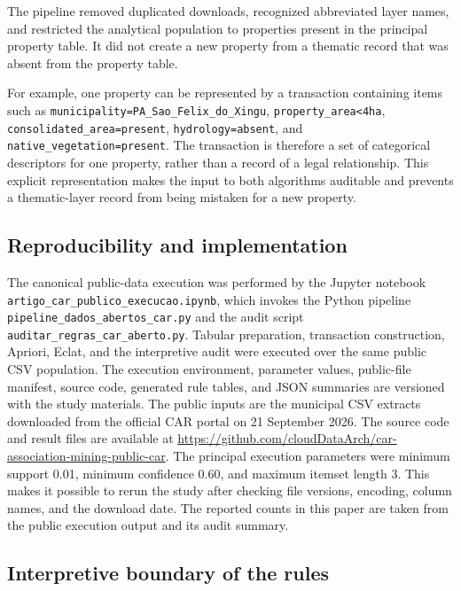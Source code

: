 \documentclass[11pt]{article}
\begin{document}
The pipeline removed duplicated downloads, recognized abbreviated layer names, and restricted the analytical population to properties present in the principal property table. It did not create a new property from a thematic record that was absent from the property table.

For example, one property can be represented by a transaction containing items such as \texttt{municipality=PA\_Sao\_Felix\_do\_Xingu}, \texttt{property\_area<4ha}, \texttt{consolidated\_area=present}, \texttt{hydrology=absent}, and \texttt{native\_vegetation=present}. The transaction is therefore a set of categorical descriptors for one property, rather than a record of a legal relationship. This explicit representation makes the input to both algorithms auditable and prevents a thematic-layer record from being mistaken for a new property.

\subsection{Reproducibility and implementation}

The canonical public-data execution was performed by the Jupyter notebook \texttt{artigo\_car\_publico\_execucao.ipynb}, which invokes the Python pipeline \texttt{pipeline\_dados\_abertos\_car.py} and the audit script \texttt{auditar\_regras\_car\_aberto.py}. Tabular preparation, transaction construction, Apriori, Eclat, and the interpretive audit were executed over the same public CSV population. The execution environment, parameter values, public-file manifest, source code, generated rule tables, and JSON summaries are versioned with the study materials. The public inputs are the municipal CSV extracts downloaded from the official CAR portal on 21 September 2026. The source code and result files are available at \url{https://github.com/cloudDataArch/car-association-mining-public-car}. The principal execution parameters were minimum support 0.01, minimum confidence 0.60, and maximum itemset length 3. This makes it possible to rerun the study after checking file versions, encoding, column names, and the download date. The reported counts in this paper are taken from the public execution output and its audit summary.

\subsection{Interpretive boundary of the rules}
\end{document}
